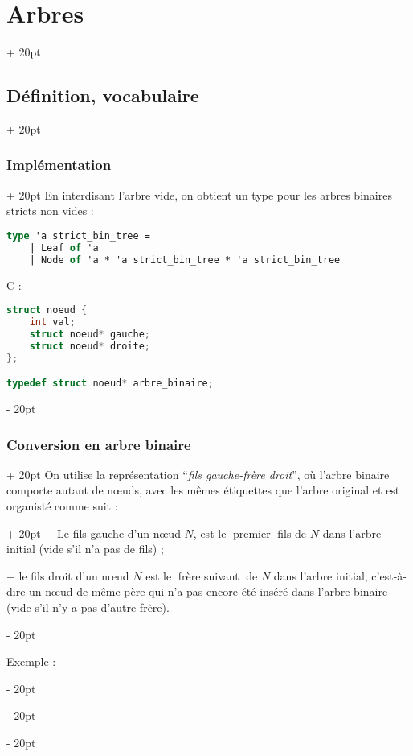 \documentclass[a4paper, 12pt, twoside]{article}
\newcommand{\simplecit}[1]{\guillemotleft$\;$#1$\;$\guillemotright}
\newcommand{\ind}[1][20pt]{\advance\leftskip + #1}
\newcommand{\deind}[1][20pt]{\advance\leftskip - #1}
\newenvironment{indt}[2][20pt]{#2 \par \ind[#1]}{\par \deind} %
\begin{document}
\begin{indt}{\section{Arbres}}
\begin{indt}{\subsection{Définition, vocabulaire}}
\begin{indt}{\subsubsection{Implémentation}}
                En interdisant l'arbre vide, on obtient un type pour les arbres binaires stricts non vides :
                
                \begin{lstlisting}[language=Caml, xleftmargin=80pt]
type 'a strict_bin_tree =
    | Leaf of 'a
    | Node of 'a * 'a strict_bin_tree * 'a strict_bin_tree
                \end{lstlisting}
                
                \vspace{6pt}
                
                C :
                \begin{lstlisting}[language=C, xleftmargin=80pt]
struct noeud {
    int val;
    struct noeud* gauche;
    struct noeud* droite;
};

typedef struct noeud* arbre_binaire;
                \end{lstlisting}
            \end{indt}
            
            \vspace{12pt}
            
            \begin{indt}{\subsubsection{Conversion en arbre binaire}}
                \begin{indt}{On utilise la représentation ``\textit{fils gauche-frère droit}'', où l'arbre binaire comporte autant de n\oe uds, avec les mêmes étiquettes que l'arbre original et est organisté comme suit :}
                    $-$ Le fils gauche d'un n\oe ud $N$, est le \simplecit{premier} fils de $N$ dans l'arbre initial (vide s'il n'a pas de fils) ;
                    
                    $-$ le fils droit d'un n\oe ud $N$ est le \simplecit{frère suivant} de $N$ dans l'arbre initial, c'est-à-dire un n\oe ud de même père qui n'a pas encore été inséré dans l'arbre binaire (vide s'il n'y a pas d'autre frère).
                \end{indt}
                
                \vspace{12pt}
                
                Exemple :
                

\end{indt}
\end{indt}
\end{indt}
\end{document}
